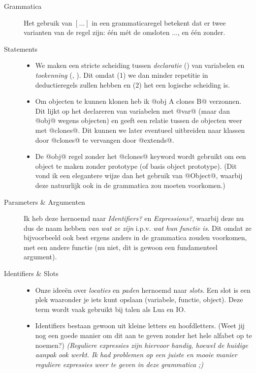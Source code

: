 \begin{description}
	\item[Grammatica] Het gebruik van $[\dots]$ in een grammaticaregel betekent dat er twee varianten van de regel zijn: één mét de omsloten $\dots$, en één zonder.
  \item[Statements] \hfill
    \begin{itemize}
    	\item We maken een stricte scheiding tussen \emph{declaratie} () van variabelen en \emph{toekenning} (, ). Dit omdat (1) we dan minder repetitie in deductieregels zullen hebben en (2) het een logische scheiding is.
      \item Om objecten te kunnen klonen heb ik @obj A clones B@ verzonnen.
        Dit lijkt op het declareren van variabelen met @var@
        (maar dan @obj@ wegens objecten)
        en geeft een relatie tussen de objecten weer met @clones@.
        Dit kunnen we later eventueel uitbreiden naar klassen door
        @clones@ te vervangen door @extends@.
      \item De @obj@ regel zonder het @clones@ keyword wordt gebruikt om een object te maken zonder prototype (of basis object prototype). (Dit vond ik een elegantere wijze dan het gebruik van @Object@, waarbij deze natuurlijk ook in de grammatica zou moeten voorkomen.)
    \end{itemize}
  \item[Parameters \& Argumenten]
    Ik heb deze hernoemd naar \emph{Identifiers?} en \emph{Expressions?}, waarbij deze nu dus de naam hebben \emph{van wat ze zijn} i.p.v. \emph{wat hun functie is}. Dit omdat ze bijvoorbeeld ook best ergens anders in de grammatica zouden voorkomen, met een andere functie (nu niet, dit is gewoon een fundamenteel argument).
  \item[Identifiers \& Slots]
    \begin{itemize}
      \item Onze ideeën over \emph{locaties} en \emph{paden}
        hernoemd naar \emph{slots}. Een slot is een plek waaronder
        je iets kunt opslaan (variabele, functie, object).
        Deze term wordt vaak gebruikt bij talen als Lua en IO.
      \item Identifiers bestaan gewoon uit kleine letters en hoofdletters.
        (Weet jij nog een goede manier om dit aan te geven zonder het hele
        alfabet op te noemen?) \emph{(Reguliere expressies zijn hiervoor handig, hoewel de huidige aanpak ook werkt. Ik had problemen op een juiste en mooie manier reguliere expressies weer te geven in deze grammatica ;)}

\end{itemize}
\end{description}
